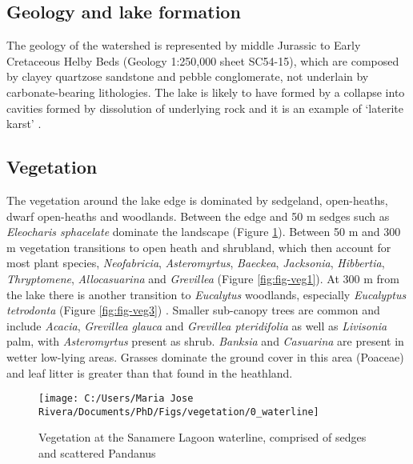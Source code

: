 \documentclass[
  12pt,
]{book}
\begin{document}
\hypertarget{geology-and-lake-formation}{%
\subsection{Geology and lake formation}\label{geology-and-lake-formation}}

The geology of the watershed is represented by middle Jurassic to Early Cretaceous Helby Beds (Geology 1:250,000 sheet SC54-15)\citep{AustralianGeoscienceInformation2020}, which are composed by clayey quartzose sandstone and pebble conglomerate, not underlain by carbonate-bearing lithologies. The lake is likely to have formed by a collapse into cavities formed by dissolution of underlying rock and it is an example of `laterite karst' \citep{grimes2008laterite}.

\hypertarget{veg}{%
\subsection{Vegetation}\label{veg}}

The vegetation around the lake edge is dominated by sedgeland, open-heaths, dwarf open-heaths and woodlands. Between the edge and 50 m sedges such as \emph{Eleocharis sphacelate} dominate the landscape (Figure \ref{fig:fig-veg2}). Between 50 m and 300 m vegetation transitions to open heath and shrubland, which then account for most plant species, \emph{Neofabricia}, \emph{Asteromyrtus}, \emph{Baeckea}, \emph{Jacksonia}, \emph{Hibbertia}, \emph{Thryptomene}, \emph{Allocasuarina} and \emph{Grevillea} (Figure \ref{fig:fig-veg1}). At 300 m from the lake there is another transition to \emph{Eucalytus} woodlands, especially \emph{Eucalyptus tetrodonta} (Figure \ref{fig:fig-veg3}) \citep{neldnerVegetationSurveyMapping1995}. Smaller sub-canopy trees are common and include \emph{Acacia}, \emph{Grevillea glauca} and \emph{Grevillea pteridifolia} as well as \emph{Livisonia} palm, with \emph{Asteromyrtus} present as shrub. \emph{Banksia} and \emph{Casuarina} are present in wetter low-lying areas. Grasses dominate the ground cover in this area (Poaceae) and leaf litter is greater than that found in the heathland.



\begin{figure}

{\centering \texttt{[image: C:/Users/Maria Jose Rivera/Documents/PhD/Figs/vegetation/0\_waterline]} 

}

\caption{Vegetation at the Sanamere Lagoon waterline, comprised of sedges and scattered Pandanus}\label{fig:fig-veg2}
\end{figure}
\end{document}
